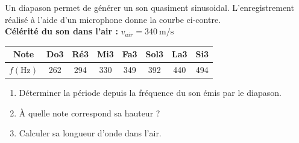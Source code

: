 \documentclass[a4paper,11pt,fleqn]{scrartcl}%
\begin{document}
\begin{exemple}
    \begin{minipage}{.53\linewidth}
Un diapason permet de générer un son quasiment sinusoidal. L'enregistrement réalisé à l'aide d'un microphone donne la courbe ci-contre.\\

\textbf{Célérité du son dans l'air :} $v_{air} = \SI{340}{\meter\per\second}$\\

\begin{tabular}{|c|c|c|c|c|c|c|c|}
    \hline
    \textbf{Note} & Do3 & Ré3 & Mi3 & Fa3 & Sol3 & La3 & Si3\\
    \hline
    $f(\unit{\hertz})$ & 262 & 294 & 330 & 349 & 392 & 440 & 494\\
    \hline
\end{tabular}

\end{minipage}
\begin{minipage}{.45\linewidth}
    \centering
\end{minipage}
\begin{enumerate}
    \item Déterminer la période depuis la fréquence du son émis par le diapason.
    \item À quelle note correspond sa hauteur ?
    \item Calculer sa longueur d'onde dans l'air.
\end{enumerate}
\end{exemple}
\end{document}
